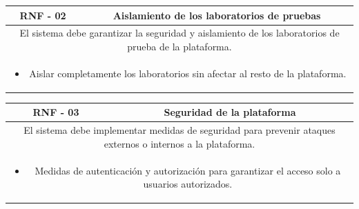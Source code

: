             \begin{table}[!htbp]
                \centering

                \begin{tabular}{|c|c|}
                    \hline
                    \textbf{RNF - 02} & \textbf{Aislamiento de los laboratorios de pruebas} \\
                    \hline
                    \multicolumn{2}{|p{15cm}|}{
                        El sistema debe garantizar la seguridad y aislamiento de los laboratorios de prueba de la plataforma.
                    } \\
                    \hline
                    \multicolumn{2}{|p{15cm}|}{
                        \begin{itemize}
                            \item Aislar completamente los laboratorios sin afectar al resto de la plataforma.
                        \end{itemize}
                        } \\
                    \hline
                \end{tabular}

                \label{tab:RNF2}
            \end{table}
            
            \begin{table}[!htbp]
                \centering

                \begin{tabular}{|c|c|}
                    \hline
                    \textbf{RNF - 03} & \textbf{Seguridad de la plataforma} \\
                    \hline
                    \multicolumn{2}{|p{15cm}|}{
                        El sistema debe implementar medidas de seguridad para prevenir ataques externos o internos a la plataforma.
                    } \\
                    \hline
                    \multicolumn{2}{|p{15cm}|}{
                        \begin{itemize}
                            \item Medidas de autenticación y autorización para garantizar el acceso solo a usuarios autorizados.
                        \end{itemize}
                        } \\
                    \hline
                \end{tabular}

                \label{tab:RNF3}
            \end{table}
            

